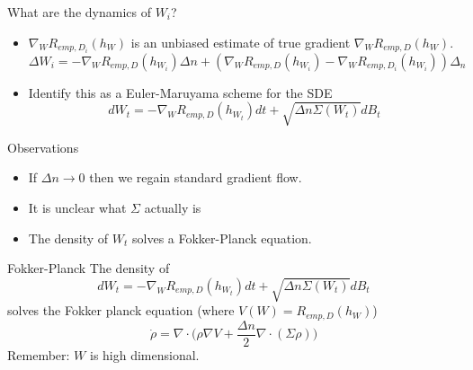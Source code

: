 \documentclass[10pt]{beamer}
\begin{document}
\begin{frame}{What are the dynamics of $W_i$?}
	\begin{itemize}
		\item $\nabla_W R_{emp,D_i}(h_W)$ is an unbiased estimate of true gradient $\nabla_W R_{emp,D}(h_W)$.
		$$
			\Delta W_i = -\nabla_W R_{emp,D}(h_{W_i})\Delta n + (\nabla_W R_{emp,D}(h_{W_i})-\nabla_W R_{emp,D_i}(h_{W_i}))\Delta_n
		$$
		\pause
		\item Identify this as a Euler-Maruyama scheme for the SDE
		$$
			dW_t = -\nabla_W R_{emp,D}(h_{W_t})dt + \sqrt{\Delta n \Sigma(W_t)} dB_t
		$$
	\end{itemize}
	\pause
	Observations
	\begin{itemize}
		\item If $\Delta n \to 0$ then we regain standard gradient flow.
		\item It is unclear what $\Sigma$ actually is
		\item The density of $W_t$ solves a Fokker-Planck equation.
	\end{itemize}
\end{frame}

\begin{frame}{Fokker-Planck}
	The density of
	$$
		dW_t = -\nabla_W R_{emp,D}(h_{W_t})dt + \sqrt{\Delta n \Sigma(W_t)} dB_t
	$$
	solves the Fokker planck equation (where $V(W) = R_{emp,D}(h_{W})$)
	$$
		\dot{\rho} = \nabla \cdot \bigg (\rho \nabla V + \frac{\Delta n}{2}\nabla \cdot (\Sigma \rho) \bigg )
	$$
	Remember: $W$ is high dimensional.
\end{frame}
\end{document}
